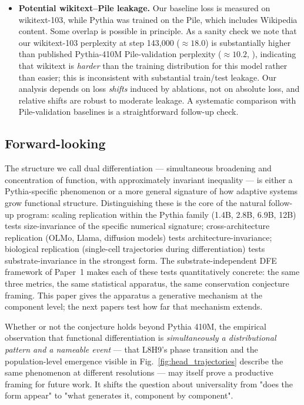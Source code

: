 \documentclass{article}
\begin{document}
\begin{itemize}
    \item \textbf{Potential wikitext--Pile leakage.} Our baseline loss is measured on wikitext-103, while Pythia was trained on the Pile, which includes Wikipedia content. Some overlap is possible in principle. As a sanity check we note that our wikitext-103 perplexity at step 143,000 ($\approx 18.0$) is substantially higher than published Pythia-410M Pile-validation perplexity ($\approx 10.2$, \citealp{biderman2023pythia}), indicating that wikitext is \emph{harder} than the training distribution for this model rather than easier; this is inconsistent with substantial train/test leakage. Our analysis depends on loss \emph{shifts} induced by ablations, not on absolute loss, and relative shifts are robust to moderate leakage. A systematic comparison with Pile-validation baselines is a straightforward follow-up check.
\end{itemize}

\subsection{Forward-looking}

The structure we call dual differentiation --- simultaneous broadening and concentration of function, with approximately invariant inequality --- is either a Pythia-specific phenomenon or a more general signature of how adaptive systems grow functional structure. Distinguishing these is the core of the natural follow-up program: scaling replication within the Pythia family (1.4B, 2.8B, 6.9B, 12B) tests size-invariance of the specific numerical signature; cross-architecture replication (OLMo, Llama, diffusion models) tests architecture-invariance; biological replication (single-cell trajectories during differentiation) tests substrate-invariance in the strongest form. The substrate-independent DFE framework of Paper~1 makes each of these tests quantitatively concrete: the same three metrics, the same statistical apparatus, the same conservation conjecture framing. This paper gives the apparatus a generative mechanism at the component level; the next papers test how far that mechanism extends.

Whether or not the conjecture holds beyond Pythia 410M, the empirical observation that functional differentiation is \emph{simultaneously a distributional pattern and a nameable event} --- that L8H9's phase transition and the population-level emergence visible in Fig.~\ref{fig:head_trajectories} describe the same phenomenon at different resolutions --- may itself prove a productive framing for future work. It shifts the question about universality from "does the form appear" to "what generates it, component by component".
\end{document}
